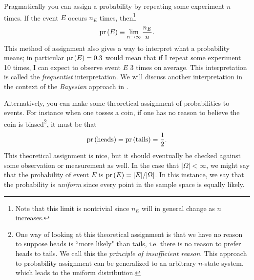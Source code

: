 Pragmatically you can assign a probability by repeating some experiment $n$
times. If the event $E$ occurs $n_E$ times, then\footnote{Note that this limit 
is nontrivial since $n_E$ will in general change as $n$ increases.}
\begin{equation}\label{eq:freqdef}
  \pr{E}\equiv\lim_{n\to\infty}\frac{n_E}{n}.
\end{equation}
This method of assignment also gives a way to interpret
what a probability means; in particular $\pr{E}=0.3$ would mean that
if I repeat some experiment 10 times, I can expect to observe event
$E$ 3 times on average. This interpretation is called
the {\it frequentist} interpretation. We will
discuss another interpretation in the context of the 
{\it Bayesian} approach in
.
 
Alternatively, you can make some theoretical assignment of probabilities to
events. For instance when one tosses a coin, if one has no reason to believe the
coin is biased\footnote{One way of looking at this theoretical assignment
is that we have no reason to suppose heads is ``more likely" than tails,
i.e. there is no reason to prefer heads to tails. 
We call this the {\it principle of insufficient reason}.
This approach to probability
assignment can be generalized to an arbitrary $n$-state system, which leads
to the uniform distribution.}, it must be that
\begin{equation}
\pr{\text{heads}}=\pr{\text{tails}}=\frac{1}{2}.
\end{equation}
This theoretical assignment is nice, but it should eventually be checked against
some observation or measurement as well.
In the case that $|\Omega|<\infty$,
we might say that the probability of event $E$ is $\pr{E}=|E|/|\Omega|$. In
this instance, we say that the probability is {\it uniform}
 since every point in the sample space is equally likely. 


